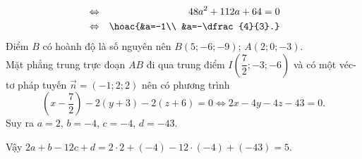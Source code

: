 \begin{ex}
{\begin{itemize}
\begin{eqnarray*}
				\\
				&\Leftrightarrow& 48a^2+112a+64=0
				\\
				&\Leftrightarrow&\hoac{&a=-1\\ &a=-\dfrac{4}{3}.}			
			\end{eqnarray*}
			Điểm $B$ có hoành độ là số nguyên nên $B(5;-6;-9)$; $A(2; 0;-3)$.\\
			Mặt phẳng trung trực đoạn $AB$ đi qua trung điểm $I\left(\dfrac{7}{2};-3;-6\right)$ và có một véc-tơ pháp tuyến $\vec{n}=(-1; 2; 2)$ nên có phương trình \[\left(x-\dfrac{7}{2}\right)-2(y+3)-2(z+6)=0\Leftrightarrow 2x-4y-4z-43=0.\]
			Suy ra $a=2$, $b=-4$, $c=-4$, $d=-43$.
		\end{itemize}
		Vậy $2a+b-12c+d=2\cdot 2+(-4)-12\cdot (-4)+(-43)=5$.
	}
\end{ex}

